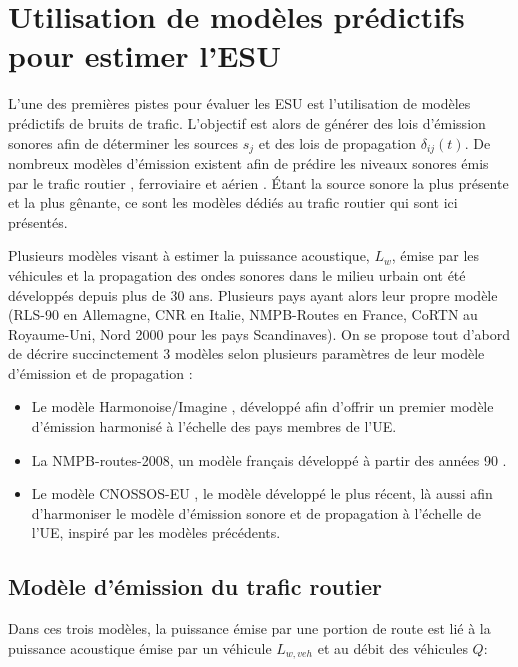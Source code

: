 \section{Utilisation de modèles prédictifs pour estimer l'ESU}

L'une des premières pistes pour évaluer les ESU est l'utilisation de modèles prédictifs de bruits de trafic. L'objectif est alors de générer des lois d'émission sonores afin de déterminer les sources $s_j$ et des lois de propagation $\delta_{ij}(t)$. De nombreux modèles d'émission existent afin de prédire les niveaux sonores émis par le trafic routier \cite{quartieri2009review}, ferroviaire \cite{van2000railway} et aérien \cite{zaporozhets1998aircraft}. Étant la source sonore la plus présente et la plus gênante, ce sont les modèles dédiés au trafic routier qui sont ici présentés.

Plusieurs modèles visant à estimer la puissance acoustique, $L_w$, émise par les véhicules et la propagation des ondes sonores dans le milieu urbain ont été développés depuis plus de 30 ans. Plusieurs pays ayant alors leur propre modèle (RLS-90 en Allemagne, CNR en Italie, NMPB-Routes en France, CoRTN au Royaume-Uni, Nord 2000 pour les pays Scandinaves). On se propose tout d'abord de décrire succinctement 3 modèles selon plusieurs paramètres de leur modèle d'émission et de propagation : 

\begin{itemize}
\item Le modèle Harmonoise/Imagine \cite{jonasson2004source}, développé afin d'offrir un premier modèle d'émission harmonisé à l'échelle des pays membres de l'UE. 
\item La NMPB-routes-2008, un modèle français développé à partir des années 90 \cite{setra_prevision_2009-1, setra_prevision_2009-2}. 
\item Le modèle CNOSSOS-EU \cite{CNOSSOS}, le modèle développé le plus récent, là aussi afin d'harmoniser le modèle d'émission sonore et de propagation à l'échelle de l'UE, inspiré par les modèles précédents. 
\end{itemize}

\subsection{Modèle d'émission du trafic routier}\label{part:modele_emission}

Dans ces trois modèles, la puissance émise par une portion de route est lié à la puissance acoustique émise par un véhicule $L_{w,veh}$ et au débit des véhicules $Q$: 

